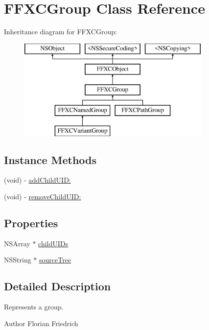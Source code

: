 \hypertarget{interface_f_f_x_c_group}{\section{F\-F\-X\-C\-Group Class Reference}
\label{interface_f_f_x_c_group}
}
Inheritance diagram for F\-F\-X\-C\-Group\-:\begin{figure}[H]
\begin{center}
\leavevmode
\includegraphics[height=5.000000cm]{interface_f_f_x_c_group}
\end{center}
\end{figure}
\subsection*{Instance Methods}
\begin{DoxyCompactItemize}
\item 
(void) -\/ \hyperlink{interface_f_f_x_c_group_a5ec273f715087b1a1741cdff53bec74b}{add\-Child\-U\-I\-D\-:}
\item 
(void) -\/ \hyperlink{interface_f_f_x_c_group_a5306d17ed98b2a84e52dfe52031d37cd}{remove\-Child\-U\-I\-D\-:}
\end{DoxyCompactItemize}
\subsection*{Properties}
\begin{DoxyCompactItemize}
\item 
N\-S\-Array $\ast$ \hyperlink{interface_f_f_x_c_group_a3da566a8c5dcf0da93f7ea2ea7a5d310}{child\-U\-I\-Ds}
\item 
N\-S\-String $\ast$ \hyperlink{interface_f_f_x_c_group_a7e2268306d098ba91483be6df120fc5a}{source\-Tree}
\end{DoxyCompactItemize}


\subsection{Detailed Description}
Represents a group. \begin{DoxyAuthor}{Author}
Florian Friedrich 
\end{DoxyAuthor}


